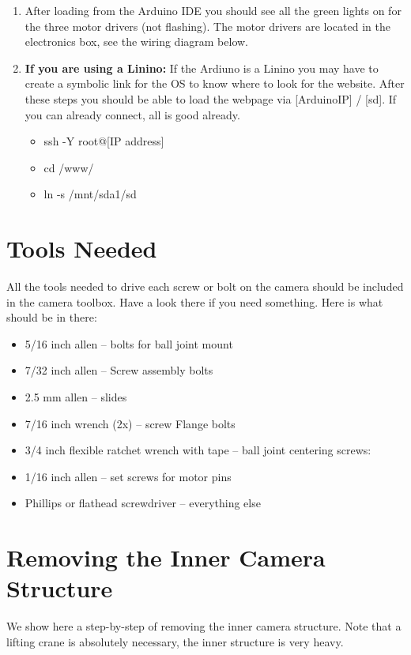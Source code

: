 \documentclass[11pt]{article}
\begin{document}
\begin{enumerate}
\item After loading from the Arduino IDE you should see all the green lights on for the three motor drivers (not flashing).  
The motor drivers are located in the electronics box, see the wiring diagram below.

\item {\textbf{If you are using a Linino:}}  If the Ardiuno is a Linino you may have to create a symbolic link for the OS to know where to look for the website.  
After these steps you should be able to load the webpage via [ArduinoIP] / [sd].  
If you can already connect, all is good already.
	\begin{itemize}
		\item ssh -Y root@[IP address]
		\item cd /www/
		\item ln -s /mnt/sda1/sd
	\end{itemize}
\end{enumerate}


\section{Tools Needed}

All the tools needed to drive each screw or bolt on the camera should be included in the camera toolbox. 
Have a look there if you need something.
Here is what should be in there:

\begin{itemize}
	\item 5/16 inch allen -- bolts for ball joint mount
	\item 7/32 inch allen -- Screw assembly bolts
	\item 2.5 mm allen -- slides
	\item 7/16 inch wrench (2x) -- screw Flange bolts
	\item 3/4 inch flexible ratchet wrench with tape -- ball joint centering screws: 
	\item 1/16 inch allen -- set screws for motor pins
	\item Phillips or flathead screwdriver -- everything else
\end{itemize}


\section{Removing the Inner Camera Structure}
We show here a step-by-step of removing the inner camera structure.  
Note that a lifting crane is absolutely necessary, the inner structure is very heavy.
\end{document}
